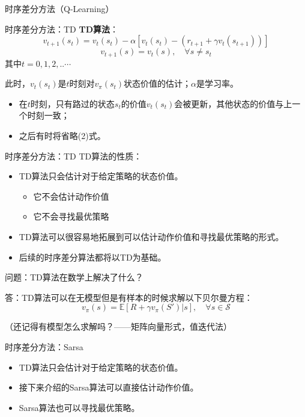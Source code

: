 \begin{section}{时序差分方法\alert{（Q-Learning）}}
\begin{frame}{时序差分方法：TD}
    \textbf{TD算法}：
    \setcounter{equation}{0}
    \begin{equation}
        v_{t+1}(s_t)=v_t(s_t)-\alpha[v_t(s_t)-(r_{t+1}+\gamma v_t(s_{t+1}))]
    \end{equation}
    \begin{equation}
        v_{t+1}(s)=v_t(s), \quad \forall s\neq s_t
    \end{equation}
    其中$t=0,1,2,..\cdots$

    此时，$v_t(s_t)$是$t$时刻对$v_\pi(s_t)$状态价值的估计；$\alpha$是学习率。
    \begin{itemize}
        \item 在$t$时刻，只有路过的状态$s_t$的价值$v_t(s_t)$会被更新，其他状态的价值与上一个时刻一致；
        \item 之后有时将省略(2)式。
    \end{itemize}
\end{frame}

\begin{frame}{时序差分方法：TD}
    TD算法的性质：
    \begin{itemize}
        \item TD算法只会估计对于给定策略的\alert{状态价值}。
        \begin{itemize}
            \item 它不会估计动作价值
            \item 它不会寻找最优策略
        \end{itemize}
        \item TD算法可以很容易地拓展到可以估计动作价值和寻找最优策略的形式。
        \item 后续的时序差分算法都将以TD为基础。
    \end{itemize}
    问题：TD算法在数学上解决了什么？

    答：TD算法可以在\alert{无模型}但是\alert{有样本}的时候求解以下贝尔曼方程：
    \[
        v_\pi(s)=\mathbb{E}[R+\gamma v_\pi(S')|s], \quad \forall s\in\mathcal{S}
    \]

    （还记得有模型怎么求解吗？——矩阵向量形式，值迭代法）
\end{frame}

\begin{frame}{时序差分方法：Sarsa}
    \begin{itemize}
        \item TD算法只会估计对于给定策略的\alert{状态价值}。
        \item 接下来介绍的Sarsa算法可以直接估计动作价值。
        \item Sarsa算法也可以寻找最优策略。
    \end{itemize}
\end{frame}


\end{section}
